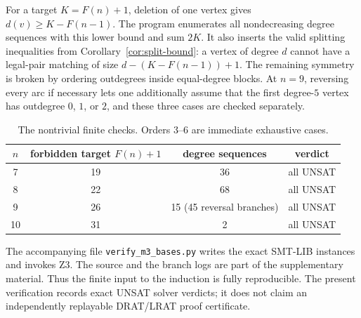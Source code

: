 \documentclass[11pt]{amsart}
\theoremstyle{definition}
\begin{document}
For a target $K=F(n)+1$, deletion of one vertex gives
$d(v)\ge K-F(n-1)$.  The program enumerates all nondecreasing degree
sequences with this lower bound and sum $2K$.  It also inserts the valid
splitting inequalities from Corollary~\ref{cor:split-bound}: a vertex of
degree $d$ cannot have a legal-pair matching of size
$d-(K-F(n-1))+1$.  The remaining symmetry is broken by ordering
outdegrees inside equal-degree blocks.  At $n=9$, reversing every arc if
necessary lets one additionally assume that the first degree-$5$ vertex
has outdegree $0$, $1$, or $2$, and these three cases are checked
separately.

\begin{table}[ht]
\centering
\begin{tabular}{c c c c}
\toprule
$n$ & forbidden target $F(n)+1$ & degree sequences & verdict \\
\midrule
7 & 19 & 36 & all UNSAT \\
8 & 22 & 68 & all UNSAT \\
9 & 26 & 15 (45 reversal branches) & all UNSAT \\
10 & 31 & 2 & all UNSAT \\
\bottomrule
\end{tabular}
\caption{The nontrivial finite checks.  Orders $3$--$6$ are immediate
exhaustive cases.}
\label{tab:computer}
\end{table}

The accompanying file \texttt{verify\_m3\_bases.py} writes the exact
SMT-LIB instances and invokes Z3.  The source and the branch logs are part
of the supplementary material.  Thus the finite input to the induction is
fully reproducible.  The present verification records exact UNSAT solver
verdicts; it does not claim an independently replayable DRAT/LRAT proof
certificate.
\end{document}
